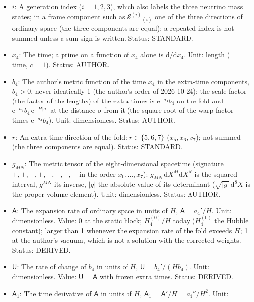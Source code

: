 \documentclass[
  10pt,
]{article}
\begin{document}
\begin{itemize}
  Unit: length (each coordinate). Status: AUTHOR.
\item
  \(i\): A generation index (\(i = 1, 2, 3\)), which also labels the
  three neutrino mass states; in a frame component such as
  \(\mathcal{S}^{(i)}{}_{(i)}\) one of the three directions of ordinary
  space (the three components are equal); a repeated index is not summed
  unless a sum sign is written. Status: STANDARD.
\item
  \(x_4\): The time; a prime on a function of \(x_4\) alone is
  \(\mathrm{d}/\mathrm{d}x_4\). Unit: length (= time, \(c = 1\)).
  Status: AUTHOR.
\item
  \(b_4\): The author's metric function of the time \(x_4\) in the
  extra-time components, \(b_4 > 0\), never identically 1 (the author's
  order of 2026-10-24); the scale factor (the factor of the lengths) of
  the extra times is \(\mathrm{e}^{-a_4}b_4\) on the fold and
  \(\mathrm{e}^{-a_4}b_4\,\mathrm{e}^{-H\lvert\sigma\rvert}\) at the
  distance \(\sigma\) from it (the square root of the warp factor times
  \(\mathrm{e}^{-a_4}b_4\)). Unit: dimensionless. Status: AUTHOR.
\item
  \(r\): An extra-time direction of the fold: \(r \in \{5, 6, 7\}\)
  (\(x_5, x_6, x_7\)); not summed (the three components are equal).
  Status: STANDARD.
\item
  \(g_{MN}\): The metric tensor of the eight-dimensional spacetime
  (signature \(+,+,+,+,-,-,-,-\) in the order \(x_0, \dots, x_7\)):
  \(g_{MN}\,\mathrm{d}X^M\mathrm{d}X^N\) is the squared interval,
  \(g^{MN}\) its inverse, \(\lvert g\rvert\) the absolute value of its
  determinant (\(\sqrt{\lvert g\rvert}\,\mathrm{d}^8X\) is the proper
  volume element). Unit: dimensionless. Status: AUTHOR.
\item
  \(\mathsf{A}\): The expansion rate of ordinary space in units of
  \(H\), \(\mathsf{A} = a_4'/H\). Unit: dimensionless. Value: 0 at the
  static block; \(H_4^{(0)}/H\) today (\(H_4^{(0)}\) the Hubble
  constant); larger than 1 whenever the expansion rate of the fold
  exceeds \(H\); 1 at the author's vacuum, which is not a solution with
  the corrected weights. Status: DERIVED.
\item
  \(\mathsf{U}\): The rate of change of \(b_4\) in units of \(H\),
  \(\mathsf{U} = b_4'/(Hb_4)\). Unit: dimensionless. Value:
  \(\mathsf{U} = \mathsf{A}\) with frozen extra times. Status: DERIVED.
\item
  \(\mathsf{A}_1\): The time derivative of \(\mathsf{A}\) in units of
  \(H\), \(\mathsf{A}_1 = \mathsf{A}'/H = a_4''/H^2\). Unit:

\end{itemize}
\end{document}
